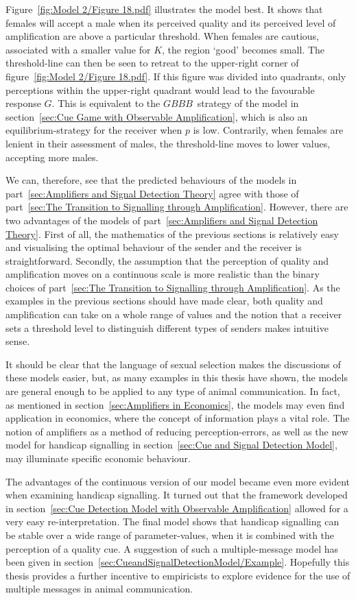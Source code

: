 \documentclass[a4paper,12pt]{article}
\numberwithin{equation}{section}
\begin{document}
Figure~\ref{fig:Model 2/Figure 18.pdf} illustrates the model best. It shows that females will accept a male when its perceived quality and its perceived level of amplification are above a particular threshold. When females are cautious, associated with a smaller value for $K$, the region `good' becomes small. The threshold-line can then be seen to retreat to the upper-right corner of figure~\ref{fig:Model 2/Figure 18.pdf}. If this figure was divided into quadrants, only perceptions within the upper-right quadrant would lead to the favourable response $G$. This is equivalent to the $GBBB$~strategy of the model in section~\ref{sec:Cue Game with Observable Amplification}, which is also an equilibrium-strategy for the receiver when $p$ is low. Contrarily, when females are lenient in their assessment of males, the threshold-line moves to lower values, accepting more males.

We can, therefore, see that the predicted behaviours of the models in part~\ref{sec:Amplifiers and Signal Detection Theory} agree with those of part~\ref{sec:The Transition to Signalling through Amplification}. However, there are two advantages of the models of part~\ref{sec:Amplifiers and Signal Detection Theory}. First of all, the mathematics of the previous sections is relatively easy and visualising the optimal behaviour of the sender and the receiver is straightforward. Secondly, the assumption that the perception of quality and amplification moves on a continuous scale is more realistic than the binary choices of part~\ref{sec:The Transition to Signalling through Amplification}. As the examples in the previous sections should have made clear, both quality and amplification can take on a whole range of values and the notion that a receiver sets a threshold level to distinguish different types of senders makes intuitive sense.

It should be clear that the language of sexual selection makes the discussions of these models easier, but, as many examples in this thesis have shown, the models are general enough to be applied to any type of animal communication. In fact, as mentioned in section~\ref{sec:Amplifiers in Economics}, the models may even find application in economics, where the concept of information plays a vital role. The notion of amplifiers as a method of reducing \mbox{perception-errors}, as well as the new model for handicap signalling in section~\ref{sec:Cue and Signal Detection Model}, may illuminate specific economic behaviour.

The advantages of the continuous version of our model became even more evident when examining handicap signalling. It turned out that the framework developed in section~\ref{sec:Cue Detection Model with Observable Amplification} allowed for a very easy re-interpretation. The final model shows that handicap signalling can be stable over a wide range of parameter-values, when it is combined with the perception of a quality cue. A suggestion of such a multiple-message model has been given in section~\ref{sec:CueandSignalDetectionModel/Example}. Hopefully this thesis provides a further incentive to empiricists to explore evidence for the use of multiple messages in animal communication.
\end{document}
